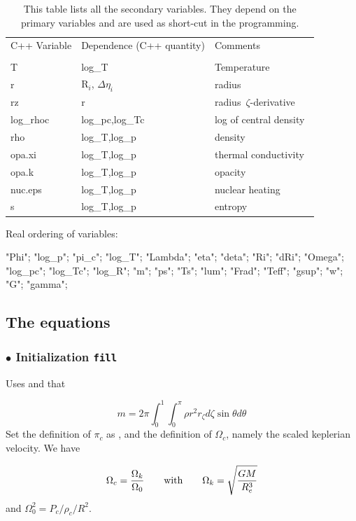 \begin{table}
\begin{center}
\begin{tabular}{lll}
\hline
C++ Variable & Dependence (C++ quantity) & Comments \\
\\
T  & log\_T & Temperature \\
r  & R$_i$, $\Delta\eta_i$      & radius \\
rz &   r    & radius $\zeta$-derivative\\
log\_rhoc &   log\_pc,log\_Tc   & log of central density \\
rho &   log\_T,log\_p    & density \\
opa.xi &   log\_T,log\_p    & thermal conductivity \\
opa.k &   log\_T,log\_p    & opacity \\
nuc.eps &   log\_T,log\_p    & nuclear heating \\
s  &   log\_T,log\_p    & entropy \\
\hline
\end{tabular}
\end{center}
\caption[]
{This table lists all the secondary variables. They depend on the
primary variables and are used as short-cut in the programming.}
\end{table}





\noindent Real ordering of variables:

"Phi"; "log\_p"; "pi\_c"; "log\_T"; "Lambda"; "eta"; "deta"; "Ri";
"dRi"; "Omega"; "log\_pc"; "log\_Tc"; "log\_R"; "m"; "ps"; "Ts"; "lum"; "Frad"; "Teff"; "gsup"; "w"; "G"; "gamma"; 

\subsection{The equations}

\subsubsection{$\bullet$ \bf Initialization {\tt fill}}

Uses  and that

\[ m=2\pi\int_0^1\int_0^\pi\rho r^2r_\zeta d\zeta\sin\theta d\theta\]
Set the definition of $\pi_c$ as , and the definition of 
$\Omega_c$, namely the scaled keplerian velocity. We have

\[ \Omega_c=\frac{\Omega_k}{\Omega_0} {\qquad {\rm with}\qquad} \Omega_k=\sqrt{\frac{GM}{R_e^3}}\]
and $\Omega_0^2=P_c/\rho_c/R^2$.

